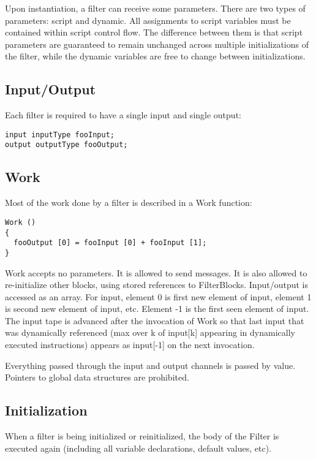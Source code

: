 \documentclass[draft]{article}
\begin{document}
Upon instantiation, a filter can receive some parameters.  There are
two types of parameters: script and dynamic.  All assignments to
script variables must be contained within script control flow.  The
difference between them is that script parameters are guaranteed to
remain unchanged across multiple initializations of the filter, while
the dynamic variables are free to change between initializations.

\subsection{Input/Output}

Each filter is required to have a single input and single output:
\begin{verbatim}
input inputType fooInput;
output outputType fooOutput;
\end{verbatim}

\subsection{Work}

Most of the work done by a filter is described in a Work function:

\begin{verbatim}
Work ()
{
  fooOutput [0] = fooInput [0] + fooInput [1];
}
\end{verbatim}

Work accepts no parameters.  It is allowed to send messages.  It is
also allowed to re-initialize other blocks, using stored references to
FilterBlocks.  Input/output is accessed as an array.  For input,
element 0 is first new element of input, element 1 is second new
element of input, etc.  Element -1 is the first seen element of input.
The input tape is advanced after the invocation of Work so that last
input that was dynamically referenced (max over k of input[k]
appearing in dynamically executed instructions) appears as input[-1]
on the next invocation.

Everything passed through the input and output channels is passed by
value.  Pointers to global data structures are prohibited.

\subsection{Initialization}

When a filter is being initialized or reinitialized, the body of the
Filter is executed again (including all variable declarations, default
values, etc).
\end{document}
